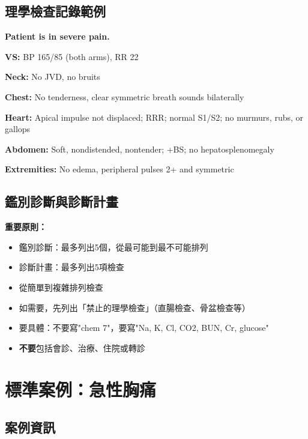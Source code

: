\documentclass[12pt,a4paper]{article}
\begin{document}
\subsection{理學檢查記錄範例}

\begin{tcolorbox}[colback=emergency_blue!5!white,colframe=emergency_blue]
\textbf{Patient is in severe pain.}

\textbf{VS:} BP 165/85 (both arms), RR 22

\textbf{Neck:} No JVD, no bruits

\textbf{Chest:} No tenderness, clear symmetric breath sounds bilaterally

\textbf{Heart:} Apical impulse not displaced; RRR; normal S1/S2; no murmurs, rubs, or gallops

\textbf{Abdomen:} Soft, nondistended, nontender; +BS; no hepatosplenomegaly

\textbf{Extremities:} No edema, peripheral pulses 2+ and symmetric
\end{tcolorbox}

\subsection{鑑別診斷與診斷計畫}

\begin{importantbox}
\textbf{重要原則：}
\begin{itemize}
    \item 鑑別診斷：最多列出5個，從最可能到最不可能排列
    \item 診斷計畫：最多列出5項檢查
    \item 從簡單到複雜排列檢查
    \item 如需要，先列出「禁止的理學檢查」（直腸檢查、骨盆檢查等）
    \item 要具體：不要寫"chem 7"，要寫"Na, K, Cl, CO2, BUN, Cr, glucose"
    \item \textbf{不要}包括會診、治療、住院或轉診
\end{itemize}
\end{importantbox}

\section{標準案例：急性胸痛}

\subsection{案例資訊}
\end{document}
